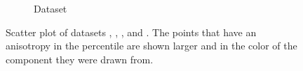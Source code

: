 \begin{figure}
\begin{subfigure}{0.23\textwidth}
			\caption{Dataset \baakmanThree}
			\label{fig:discussion:anisotropy:baakman3}
		\end{subfigure}			
		\caption{Scatter plot of datasets
			 \ferdosiTwo, %
			 \baakmanTwo, %
			 \ferdosiThree, and %
			 \baakmanThree. %
			The points that have an anisotropy in the  percentile are shown larger and in the color of the component they were drawn from.}
		\label{fig:discussion:anisotropy:multisphere}
	\end{figure}	